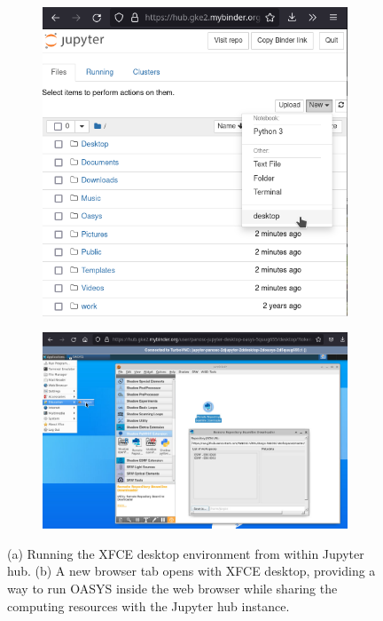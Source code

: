 \documentclass[10pt]{scrartcl}
\begin{document}
\begin{figure}[htb]
    \centering
    \begin{subfigure}{0.3\textwidth}
        \includegraphics{figures/jupyter_select_desktop.png}
        \caption{}
        \label{fig:jupyter_select}
    \end{subfigure}
    \hfil
    \begin{subfigure}{0.5\textwidth}
        \includegraphics{figures/jupyter_oasys_run.png}
        \caption{}
        \label{fig:oasys_run}
    \end{subfigure}%
    \caption{(a) Running the XFCE desktop environment from within Jupyter hub. (b) A new browser tab opens with XFCE desktop, providing a way to run OASYS inside the web browser while sharing the computing resources with the Jupyter hub instance.}
    \label{fig:oasysJupyter}
\end{figure}
\end{document}
